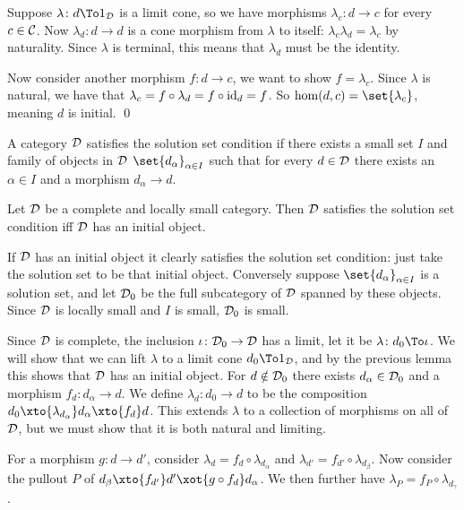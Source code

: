 \elemm

\bproof

    Suppose $\lambda\colon d\To1_\D$ is a limit cone, so we have morphisms $\lambda_c\colon d\to c$ for every $c\in{{\cal C}}$.
    Now $\lambda_d\colon d\to d$ is a cone morphism from $\lambda$ to itself: $\lambda_c\lambda_d=\lambda_c$ by naturality.
    Since $\lambda$ is terminal, this means that $\lambda_d$ must be the identity.

    Now consider another morphism $f\colon d\to c$, we want to show $f=\lambda_c$.
    Since $\lambda$ is natural, we have that $\lambda_c=f\circ\lambda_d=f\circ{\rm id}_d=f$.
    So $\hom(d,c)=\set{\lambda_c}$, meaning $d$ is initial.
    \qed

\eproof

\bdefn

    A category ${{\cal D}}$ satisfies the {\emphcolor solution set condition} if there exists a small set $I$ and family of objects in ${{\cal D}}$ $\set{d_\alpha}_{\alpha\in I}$
    such that for every $d\in{{\cal D}}$ there exists an $\alpha\in I$ and a morphism $d_\alpha\to d$.

\edefn

\blemm

    Let ${{\cal D}}$ be a complete and locally small category.
    Then ${{\cal D}}$ satisfies the solution set condition iff ${{\cal D}}$ has an initial object.

\elemm

\bproof

    If ${{\cal D}}$ has an initial object it clearly satisfies the solution set condition: just take the solution set to be that initial object.
    Conversely suppose $\set{d_\alpha}_{\alpha\in I}$ is a solution set, and let ${{\cal D}}_0$ be the full subcategory of ${{\cal D}}$ spanned by these objects.
    Since ${{\cal D}}$ is locally small and $I$ is small, ${{\cal D}}_0$ is small.

    Since ${{\cal D}}$ is complete, the inclusion $\iota\colon{{\cal D}}_0\to{{\cal D}}$ has a limit, let it be $\lambda\colon d_0\To\iota$.
    We will show that we can lift $\lambda$ to a limit cone $d_0\To1_\D$, and by the previous lemma this shows that ${{\cal D}}$ has an initial object.
    For $d\notin{{\cal D}}_0$ there exists $d_\alpha\in{{\cal D}}_0$ and a morphism $f_d\colon d_\alpha\to d$.
    We define $\lambda_d\colon d_0\to d$ to be the composition $d_0\xto{\lambda_{d_\alpha}}d_\alpha\xto{f_d}d$.
    This extends $\lambda$ to a collection of morphisms on all of ${{\cal D}}$, but we must show that it is both natural and limiting.

    For a morphism $g\colon d\to d'$, consider $\lambda_d=f_d\circ\lambda_{d_\alpha}$ and $\lambda_{d'}=f_{d'}\circ\lambda_{d_\beta}$.
    Now consider the pullout $P$ of $d_\beta\xto{f_{d'}}d'\xot{g\circ f_d}d_\alpha$.
    We then further have $\lambda_P=f_P\circ\lambda_{d_\gamma}$.

